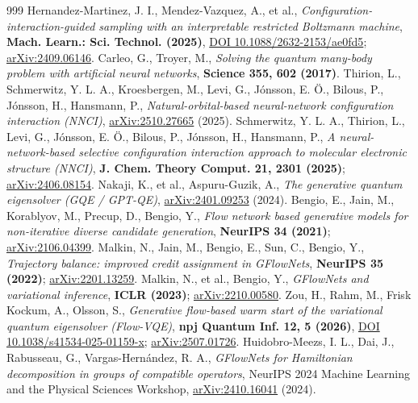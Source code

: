 \documentclass[11pt]{article}
\begin{document}
\begin{thebibliography}{999}
 Hernandez-Martinez, J. I., Mendez-Vazquez, A., et al., \emph{Configuration-interaction-guided sampling with an interpretable restricted Boltzmann machine}, \textbf{Mach. Learn.: Sci. Technol. (2025)}, \href{https://doi.org/10.1088/2632-2153/ae0fd5}{DOI 10.1088/2632-2153/ae0fd5}; \href{https://arxiv.org/abs/2409.06146}{arXiv:2409.06146}.
 Carleo, G., Troyer, M., \emph{Solving the quantum many-body problem with artificial neural networks}, \textbf{Science 355, 602 (2017)}.
 Thirion, L., Schmerwitz, Y. L. A., Kroesbergen, M., Levi, G., Jónsson, E. Ö., Bilous, P., Jónsson, H., Hansmann, P., \emph{Natural-orbital-based neural-network configuration interaction (NNCI)}, \href{https://arxiv.org/abs/2510.27665}{arXiv:2510.27665} (2025).
 Schmerwitz, Y. L. A., Thirion, L., Levi, G., Jónsson, E. Ö., Bilous, P., Jónsson, H., Hansmann, P., \emph{A neural-network-based selective configuration interaction approach to molecular electronic structure (NNCI)}, \textbf{J. Chem. Theory Comput. 21, 2301 (2025)}; \href{https://arxiv.org/abs/2406.08154}{arXiv:2406.08154}.
 Nakaji, K., et al., Aspuru-Guzik, A., \emph{The generative quantum eigensolver (GQE / GPT-QE)}, \href{https://arxiv.org/abs/2401.09253}{arXiv:2401.09253} (2024).
 Bengio, E., Jain, M., Korablyov, M., Precup, D., Bengio, Y., \emph{Flow network based generative models for non-iterative diverse candidate generation}, \textbf{NeurIPS 34 (2021)}; \href{https://arxiv.org/abs/2106.04399}{arXiv:2106.04399}.
 Malkin, N., Jain, M., Bengio, E., Sun, C., Bengio, Y., \emph{Trajectory balance: improved credit assignment in GFlowNets}, \textbf{NeurIPS 35 (2022)}; \href{https://arxiv.org/abs/2201.13259}{arXiv:2201.13259}.
 Malkin, N., et al., Bengio, Y., \emph{GFlowNets and variational inference}, \textbf{ICLR (2023)}; \href{https://arxiv.org/abs/2210.00580}{arXiv:2210.00580}.
 Zou, H., Rahm, M., Frisk Kockum, A., Olsson, S., \emph{Generative flow-based warm start of the variational quantum eigensolver (Flow-VQE)}, \textbf{npj Quantum Inf. 12, 5 (2026)}, \href{https://doi.org/10.1038/s41534-025-01159-x}{DOI 10.1038/s41534-025-01159-x}; \href{https://arxiv.org/abs/2507.01726}{arXiv:2507.01726}.
 Huidobro-Meezs, I. L., Dai, J., Rabusseau, G., Vargas-Hern\'andez, R. A., \emph{GFlowNets for Hamiltonian decomposition in groups of compatible operators}, NeurIPS 2024 Machine Learning and the Physical Sciences Workshop, \href{https://arxiv.org/abs/2410.16041}{arXiv:2410.16041} (2024).

\end{thebibliography}
\end{document}
